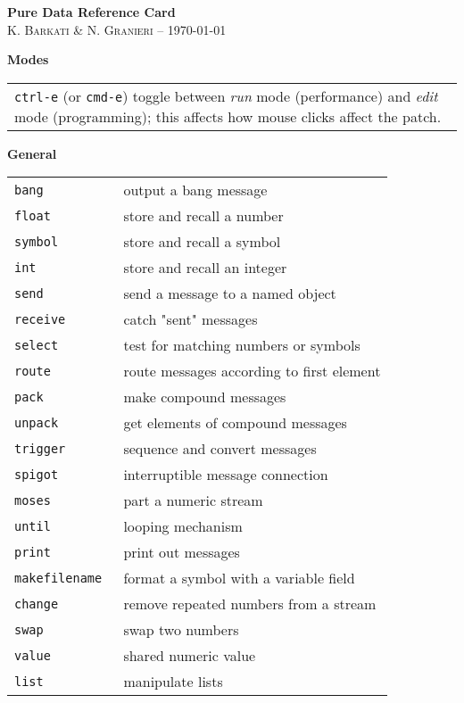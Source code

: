 \documentclass[a4paper, landscape, 9pt]{extarticle}
\newcommand{\refcardtitle}[1]{
  \begin{center}
    \textbf{\small{#1}}
  \end{center}
}
\begin{document}
\begin{multicols}{3}

  \begin{center}
    \Large{\textbf{Pure Data Reference Card}} \\
    \small{K. \textsc{Barkati} \& N. \textsc{Granieri} -- \today} 
  \end{center}

  \footnotesize

  \refcardtitle{Modes}
  \begin{tabularx}{9.1cm}{X}
    \texttt{ctrl-e} (or \texttt{cmd-e}) toggle between \emph{run} mode (performance) and \emph{edit} mode (programming); this affects how mouse clicks affect the patch.
  \end{tabularx}

  \refcardtitle{General}
  \begin{tabularx}{9cm}{>{\tt}l X}
    bang & output a bang message \\
    float & store and recall a number  \\
    symbol & store and recall a symbol \\
    int & store and recall an integer  \\
    send & send a message to a named object  \\
    receive & catch "sent" messages  \\
    select & test for matching numbers or symbols  \\
    route & route messages according to first element  \\
    pack & make compound messages  \\
    unpack & get elements of compound messages  \\
    trigger & sequence and convert messages  \\
    spigot & interruptible message connection  \\
    moses & part a numeric stream  \\
    until & looping mechanism  \\
    print & print out messages  \\
    makefilename & format a symbol with a variable field  \\
    change & remove repeated numbers from a stream  \\
    swap & swap two numbers  \\
    value & shared numeric value \\
    list & manipulate lists \\
  \end{tabularx}


\end{multicols}
\end{document}
